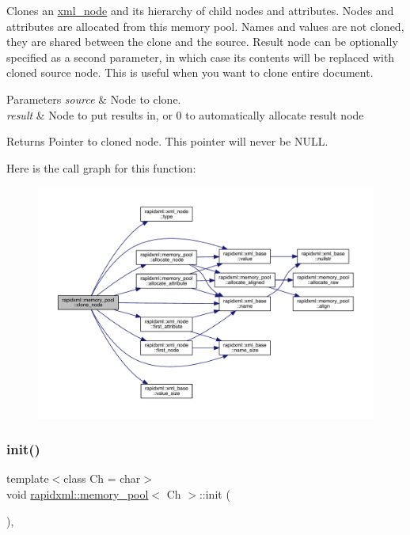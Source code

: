 Clones an \mbox{\hyperlink{classrapidxml_1_1xml__node}{xml\+\_\+node}} and its hierarchy of child nodes and attributes. Nodes and attributes are allocated from this memory pool. Names and values are not cloned, they are shared between the clone and the source. Result node can be optionally specified as a second parameter, in which case its contents will be replaced with cloned source node. This is useful when you want to clone entire document. 
\begin{DoxyParams}{Parameters}
{\em source} & Node to clone. \\
\hline
{\em result} & Node to put results in, or 0 to automatically allocate result node \\
\hline
\end{DoxyParams}
\begin{DoxyReturn}{Returns}
Pointer to cloned node. This pointer will never be N\+U\+LL. 
\end{DoxyReturn}
Here is the call graph for this function\+:\nopagebreak
\begin{figure}[H]
\begin{center}
\leavevmode
\includegraphics[width=350pt]{classrapidxml_1_1memory__pool_a0a10679fc17597d339a0dc107f8a94ac_cgraph}
\end{center}
\end{figure}
\mbox{\label{classrapidxml_1_1memory__pool_a1076043ef092e327e59dd988c1ba82fb}} 
\subsubsection{\texorpdfstring{init()}{init()}}
{\footnotesize\ttfamily template$<$class Ch  = char$>$ \\
void \mbox{\hyperlink{classrapidxml_1_1memory__pool}{rapidxml\+::memory\+\_\+pool}}$<$ Ch $>$\+::init (\begin{DoxyParamCaption}{ }\end{DoxyParamCaption})\hspace{0.3cm}{\ttfamily [inline]}, {\ttfamily [private]}}

